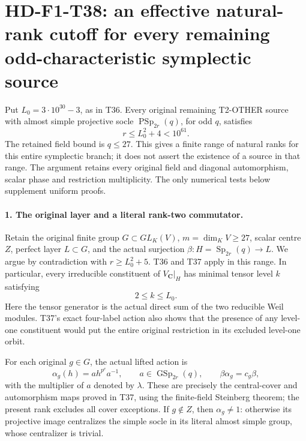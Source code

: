 \section[HD-F1-T38: an effective odd symplectic rank cutoff]{HD-F1-T38: an effective natural-rank cutoff for every remaining odd-characteristic symplectic source}
\label{sec:f1-symplectic-bounded-level-rank-cutoff}

Put \(L_0=3\cdot10^{30}-3\), as in T36. Every original
remaining T2-OTHER source with almost simple projective
socle \(\operatorname{PSp}_{2r}(q)\), for odd \(q\), satisfies
\[
 \boxed{\qquad r\le L_0^2+4<10^{61}.\qquad}
 \tag{F1T38.1}
\]
The retained field bound is \(q\le27\). This gives a finite
range of natural ranks for this entire symplectic branch;
it does not assert the existence of a source in that range.
The argument retains every original field and diagonal
automorphism, scalar phase and restriction multiplicity.
The only numerical tests below supplement uniform proofs.

\paragraph{1. The original layer and a literal rank-two commutator.}
Retain the original finite group \(G\subset GL_K(V)\),
\(m=\dim_KV\ge27\), scalar centre \(Z\), perfect layer
\(L\subset G\), and the actual surjection
\(\beta:H=\operatorname{Sp}_{2r}(q)\longrightarrow L\).
We argue by contradiction with \(r\ge L_0^2+5\).
T36 and T37 apply in this range. In particular, every
irreducible constituent of \(V_{\mathbf C}|_H\) has
minimal tensor level \(k\) satisfying
\[
                         2\le k\le L_0.
 \tag{F1T38.2}
\]
Here the tensor generator is the actual direct sum of the
two reducible Weil modules. T37's exact four-label action
also shows that the presence of any level-one constituent
would put the entire original restriction in its excluded
level-one orbit.

For each original \(g\in G\), the actual lifted action is
\[
 \alpha_g(h)=a h^{p^e}a^{-1},\qquad
 a\in\operatorname{GSp}_{2r}(q),\qquad
 \beta\alpha_g=c_g\beta,
 \tag{F1T38.3}
\]
with the multiplier of \(a\) denoted by \(\lambda\).
These are precisely the central-cover and automorphism maps
proved in T37, using the finite-field Steinberg theorem;
the present rank excludes all cover exceptions. If
\(g\notin Z\), then \(\alpha_g\ne1\): otherwise its
projective image centralizes the simple socle in its
literal almost simple group, whose centralizer is trivial.

